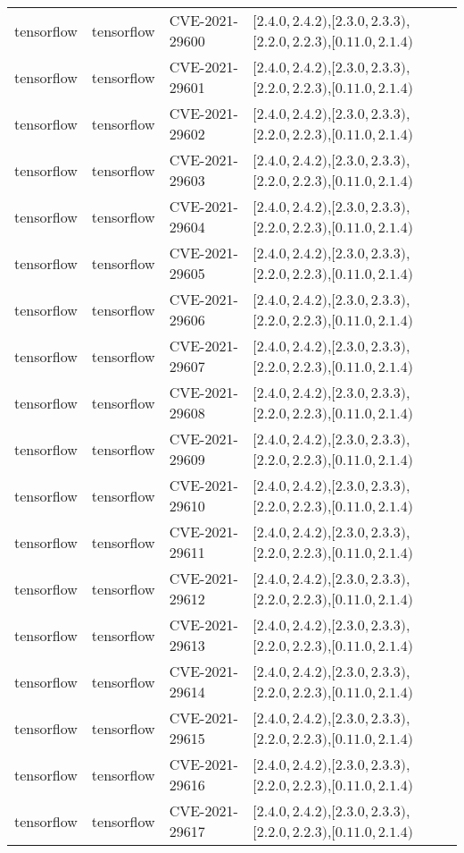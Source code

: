 \begin{tabular}{llll}
tensorflow & tensorflow & CVE-2021-29600 & $[2.4.0,2.4.2)$,$[2.3.0,2.3.3)$,$[2.2.0,2.2.3)$,$[0.11.0,2.1.4)$ \\
tensorflow & tensorflow & CVE-2021-29601 & $[2.4.0,2.4.2)$,$[2.3.0,2.3.3)$,$[2.2.0,2.2.3)$,$[0.11.0,2.1.4)$ \\
tensorflow & tensorflow & CVE-2021-29602 & $[2.4.0,2.4.2)$,$[2.3.0,2.3.3)$,$[2.2.0,2.2.3)$,$[0.11.0,2.1.4)$ \\
tensorflow & tensorflow & CVE-2021-29603 & $[2.4.0,2.4.2)$,$[2.3.0,2.3.3)$,$[2.2.0,2.2.3)$,$[0.11.0,2.1.4)$ \\
tensorflow & tensorflow & CVE-2021-29604 & $[2.4.0,2.4.2)$,$[2.3.0,2.3.3)$,$[2.2.0,2.2.3)$,$[0.11.0,2.1.4)$ \\
tensorflow & tensorflow & CVE-2021-29605 & $[2.4.0,2.4.2)$,$[2.3.0,2.3.3)$,$[2.2.0,2.2.3)$,$[0.11.0,2.1.4)$ \\
tensorflow & tensorflow & CVE-2021-29606 & $[2.4.0,2.4.2)$,$[2.3.0,2.3.3)$,$[2.2.0,2.2.3)$,$[0.11.0,2.1.4)$ \\
tensorflow & tensorflow & CVE-2021-29607 & $[2.4.0,2.4.2)$,$[2.3.0,2.3.3)$,$[2.2.0,2.2.3)$,$[0.11.0,2.1.4)$ \\
tensorflow & tensorflow & CVE-2021-29608 & $[2.4.0,2.4.2)$,$[2.3.0,2.3.3)$,$[2.2.0,2.2.3)$,$[0.11.0,2.1.4)$ \\
tensorflow & tensorflow & CVE-2021-29609 & $[2.4.0,2.4.2)$,$[2.3.0,2.3.3)$,$[2.2.0,2.2.3)$,$[0.11.0,2.1.4)$ \\
tensorflow & tensorflow & CVE-2021-29610 & $[2.4.0,2.4.2)$,$[2.3.0,2.3.3)$,$[2.2.0,2.2.3)$,$[0.11.0,2.1.4)$ \\
tensorflow & tensorflow & CVE-2021-29611 & $[2.4.0,2.4.2)$,$[2.3.0,2.3.3)$,$[2.2.0,2.2.3)$,$[0.11.0,2.1.4)$ \\
tensorflow & tensorflow & CVE-2021-29612 & $[2.4.0,2.4.2)$,$[2.3.0,2.3.3)$,$[2.2.0,2.2.3)$,$[0.11.0,2.1.4)$ \\
tensorflow & tensorflow & CVE-2021-29613 & $[2.4.0,2.4.2)$,$[2.3.0,2.3.3)$,$[2.2.0,2.2.3)$,$[0.11.0,2.1.4)$ \\
tensorflow & tensorflow & CVE-2021-29614 & $[2.4.0,2.4.2)$,$[2.3.0,2.3.3)$,$[2.2.0,2.2.3)$,$[0.11.0,2.1.4)$ \\
tensorflow & tensorflow & CVE-2021-29615 & $[2.4.0,2.4.2)$,$[2.3.0,2.3.3)$,$[2.2.0,2.2.3)$,$[0.11.0,2.1.4)$ \\
tensorflow & tensorflow & CVE-2021-29616 & $[2.4.0,2.4.2)$,$[2.3.0,2.3.3)$,$[2.2.0,2.2.3)$,$[0.11.0,2.1.4)$ \\
tensorflow & tensorflow & CVE-2021-29617 & $[2.4.0,2.4.2)$,$[2.3.0,2.3.3)$,$[2.2.0,2.2.3)$,$[0.11.0,2.1.4)$ \\

\end{tabular}
